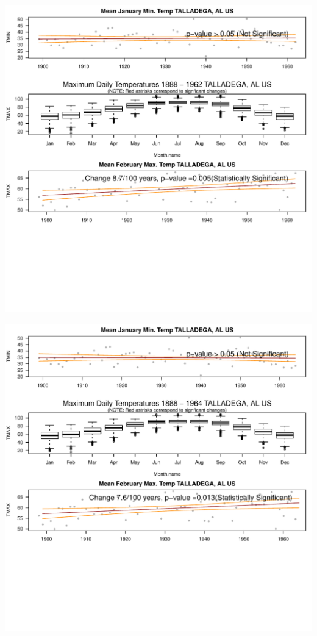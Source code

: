\documentclass{article}\usepackage[]{graphicx}\usepackage[]{color}
\makeatletter
\def\maxwidth{ %
  \ifdim\Gin@nat@width>\linewidth
    \linewidth
  \else
    \Gin@nat@width
  \fi
}
\newenvironment{knitrout}{}{} %
\makeatother
\begin{document}
\begin{knitrout}
\includegraphics[width=\maxwidth]{figure/static_template-27} 

\includegraphics[width=\maxwidth]{figure/static_template-28} 


\end{knitrout}
\end{document}
